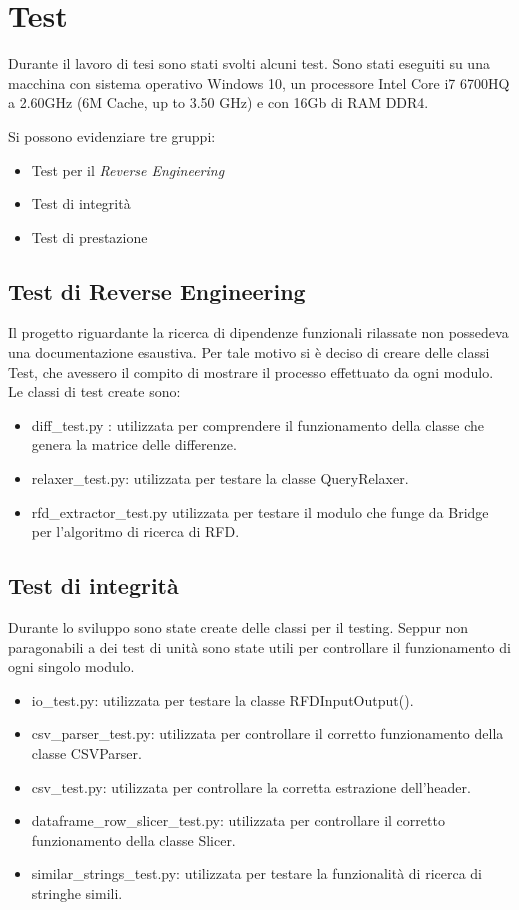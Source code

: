 \section{Test}
Durante il lavoro di tesi sono stati svolti alcuni test. 
Sono stati eseguiti su una macchina con sistema operativo Windows 10, un processore Intel Core i7 6700HQ a 2.60GHz (6M Cache, up to 3.50 GHz) e con 16Gb di RAM DDR4.

Si possono evidenziare tre gruppi:
\begin{itemize}
    \item Test per il \textit{Reverse Engineering}
    \item Test di integrità 
    \item Test di prestazione
\end{itemize}

\subsection{Test di Reverse Engineering}
Il progetto riguardante la ricerca di dipendenze funzionali rilassate non possedeva una documentazione esaustiva. Per tale motivo si è deciso di creare delle classi Test, che avessero il compito di mostrare il processo effettuato da ogni modulo.
Le classi di test create sono:
\begin{itemize}[noitemsep]
\let\labelitemi\labelitemii
    \item diff{\_}test.py : utilizzata per comprendere il funzionamento della classe che genera la matrice delle differenze.
    \item relaxer{\_}test.py: utilizzata per testare la classe QueryRelaxer.
    \item rfd{\_}extractor{\_}test.py utilizzata per testare il modulo che funge da Bridge per l'algoritmo di ricerca di RFD.
\end{itemize}

\subsection{Test di integrità}
Durante lo sviluppo sono state create delle classi per il testing. Seppur non paragonabili a dei test di unità sono state utili per controllare il funzionamento di ogni singolo modulo.
\begin{itemize}[noitemsep]
\let\labelitemi\labelitemii
    \item io{\_}test.py: utilizzata per testare la classe RFDInputOutput().
    \item csv{\_}parser{\_}test.py: utilizzata per controllare il corretto funzionamento della classe CSVParser. 
    \item csv{\_}test.py: utilizzata per controllare la corretta estrazione dell'header.
    \item dataframe{\_}row{\_}slicer{\_}test.py: utilizzata per controllare il corretto funzionamento della classe Slicer.
    \item similar{\_}strings{\_}test.py: utilizzata per testare la funzionalità di ricerca di stringhe simili.
\end{itemize}
